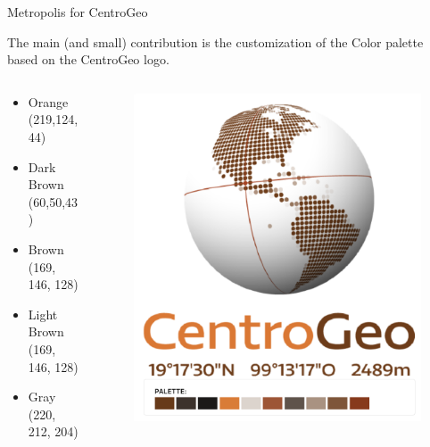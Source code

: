 \documentclass[10pt]{beamer}
\begin{document}
\begin{frame}[fragile]{Metropolis for CentroGeo}

The main (and small) contribution is the customization of the Color palette based on the CentroGeo logo.

\begin{columns}
\begin{column}{0.5\textwidth}


	\begin{itemize}
		\item \textcolor{orange@centrogeo}{Orange (219,124,44) }
		\item \textcolor{darkbrown@centrogeo}{Dark Brown (60,50,43) }
		\item \textcolor{brown@centrogeo}{Brown (169, 146, 128) }
		\item \textcolor{lightbrown@centrogeo}{Light Brown (169, 146, 128) }
		\item \textcolor{gray@centrogeo}{Gray (220, 212, 204) }
	\end{itemize}

\end{column}
\begin{column}{0.5\textwidth}  %

\begin{figure}
\centering
\includegraphics[width=0.7\columnwidth]{figures/cgeopalette.png}
\end{figure}

\end{column}
\end{columns}


\end{frame}
\end{document}
